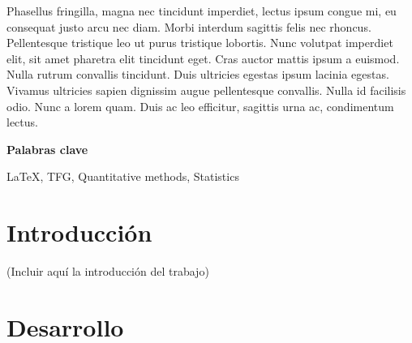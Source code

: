 \documentclass[13pt,a4paper]{report}
\numberwithin{figure}{section} %
\numberwithin{table}{section} %
\begin{document}
\vspace{12pt}

Phasellus fringilla, magna nec tincidunt imperdiet, lectus ipsum congue mi, eu consequat justo arcu nec diam. Morbi interdum sagittis felis nec rhoncus. Pellentesque tristique leo ut purus tristique lobortis. Nunc volutpat imperdiet elit, sit amet pharetra elit tincidunt eget. Cras auctor mattis ipsum a euismod. Nulla rutrum convallis tincidunt. Duis ultricies egestas ipsum lacinia egestas. Vivamus ultricies sapien dignissim augue pellentesque convallis. Nulla id facilisis odio. Nunc a lorem quam. Duis ac leo efficitur, sagittis urna ac, condimentum lectus.

\vspace{12pt}

{\fontsize{16}{19.2}\selectfont \textbf{Palabras clave}}

\vspace{12pt}

\LaTeX, TFG, Quantitative methods, Statistics


\newpage  


\section{Introducción}

\vspace{12pt}

(Incluir aquí la introducción del trabajo)

\vspace{12pt}

\section{Desarrollo}  
\end{document}
